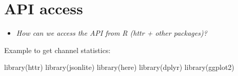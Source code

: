 \documentclass[
]{book}
\newenvironment{Shaded}{\begin{snugshade}}{\end{snugshade}}
\newcommand{\FunctionTok}[1]{\textcolor[rgb]{0.00,0.00,0.00}{#1}}
\newcommand{\NormalTok}[1]{#1}
\providecommand{\tightlist}{%
  \setlength{\itemsep}{0pt}\setlength{\parskip}{0pt}}
\begin{document}
\hypertarget{api-access-8}{%
\section{API access}\label{api-access-8}}

\begin{itemize}
\tightlist
\item
  \emph{How can we access the API from R (httr + other packages)?}
\end{itemize}

Example to get channel statistics:

\begin{Shaded}
\begin{Highlighting}[]
\FunctionTok{library}\NormalTok{(httr)}
\FunctionTok{library}\NormalTok{(jsonlite)}
\FunctionTok{library}\NormalTok{(here)}
\FunctionTok{library}\NormalTok{(dplyr)}
\FunctionTok{library}\NormalTok{(ggplot2)}
\end{Highlighting}
\end{Shaded}
\end{document}
